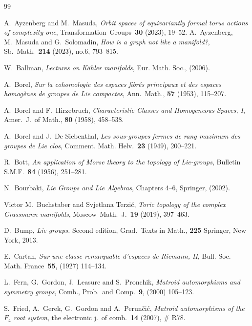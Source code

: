 \documentclass{amsart}
\theoremstyle{definition}
\theoremstyle{remark}
\numberwithin{equation}{section}
\begin{document}
\begin{thebibliography}{99}

A.~Ayzenberg and M.~Masuda,
\emph{Orbit spaces of equivariantly formal torus actions of complexity one},
Transformation~Groups~\textbf{30} (2023), 19--52.
%
A.~Ayzenberg, M.~Masuda and G.~Solomadin,
\emph{How is a graph not like a manifold?},
Sb.~Math.~\textbf{214} (2023), no.6, 793--815.

W.~Ballman, 
\emph{Lectures on K\"ahler manifolds},
Eur. Math. Soc., (2006).

A.~Borel, 
\emph{Sur la cohomologie des espaces fibr\'es principaux et des espaces homog\`enes de groupes de Lie compactes},
Ann.~Math., \textbf{57} (1953), 115--207.

A.~Borel and F.~Hirzebruch, 
\emph{Characteristic Classes and Homogeneous Spaces, I},
Amer.~J.~of Math., \textbf{80} (1958), 458--538.

A.~Borel and J.~De Siebenthal, 
\emph{Les sous-groupes fermes de rang maximum des groupes de Lie clos}, Comment. Math. Helv.~\textbf{23} (1949), 200--221.

R.~Bott,
\emph{An application of Morse theory to the topology of Lie-groups}, Bulletin S.M.F.~\textbf{84} (1956), 251--281.

N.~Bourbaki,
\emph{Lie Groups and Lie Algebras}, Chapters 4--6,
Springer, (2002).

Victor M.~Buchstaber and Svjetlana Terzi\'c,
\emph{Toric topology of the complex Grassmann manifolds},
Moscow~Math.~J.~\textbf{19} (2019), 397--463.

D.~Bump, 
\emph{Lie groups.} Second edition,
Grad.~Texts in Math., \textbf{225}
Springer, New York, 2013. %

E.~Cartan,
\emph{Sur une classe remarquable d'espaces de Riemann, II},
Bull. Soc. Math. France~\textbf{55}, (1927) 114--134.

L.~Fern, G.~Gordon, J.~Leasure and S.~Pronchik,
\emph{Matroid automorphisms and symmetry groups},
Comb., Prob.~and Comp.~\textbf{9}, (2000) 105--123.

S.~Fried, A.~Gerek, G.~Gordon and A.~Perun\v{c}i\'{c}, 
\emph{Matroid automorphisms of the $F_4$ root system},
the electronic j.~of comb.~\textbf{14} (2007), \# R78.


\end{thebibliography}
\end{document}
